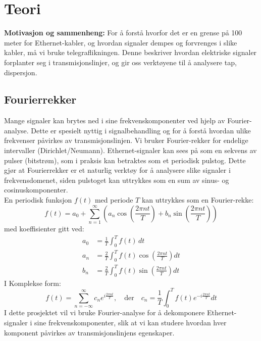 
\section{Teori}

    \textbf{Motivasjon og sammenheng:} For å forstå hvorfor det er en grense på 100 meter for Ethernet-kabler, og hvordan signaler dempes og forvrenges i slike kabler, må vi bruke telegraflikningen. Denne beskriver hvordan elektriske signaler forplanter seg i transmisjonslinjer, og gir oss verktøyene til å analysere tap, dispersjon.

\subsection{Fourierrekker}

Mange signaler kan brytes ned i sine frekvenskomponenter ved hjelp av Fourier-analyse. Dette er spesielt nyttig i signalbehandling og for å forstå hvordan ulike frekvenser påvirkes av transmisjonslinjen. Vi bruker Fourier-rekker for endelige intervaller (Dirichlet/Neumann). Ethernet-signaler kan sees på som en sekvens av pulser (bitstrøm), som i praksis kan betraktes som et periodisk pulstog. Dette gjør at Fourierrekker er et naturlig verktøy for å analysere slike signaler i frekvensdomenet, siden pulstoget kan uttrykkes som en sum av sinus- og cosinuskomponenter.\\[1em]
En periodisk funksjon $f(t)$ med periode $T$ kan uttrykkes som en Fourier-rekke:
\begin{equation}
f(t) = a_0 + \sum_{n=1}^{\infty} \left( a_n \cos\left(\frac{2\pi n t}{T}\right) + b_n \sin\left(\frac{2\pi n t}{T}\right) \right)
\end{equation}
med koeffisienter gitt ved:
\begin{align*}
a_0 &= \frac{1}{T} \int_{0}^{T} f(t) \, dt \\
a_n &= \frac{2}{T} \int_{0}^{T} f(t) \cos\left(\frac{2\pi n t}{T}\right) dt \\
b_n &= \frac{2}{T} \int_{0}^{T} f(t) \sin\left(\frac{2\pi n t}{T}\right) dt
\end{align*}
I Komplekse form:
\begin{equation}
f(t) = \sum_{n=-\infty}^{\infty} c_n e^{i \frac{2\pi n t}{T}}, \quad \text{der} \quad c_n = \frac{1}{T} \int_{0}^{T} f(t) e^{-i \frac{2\pi n t}{T}} dt
\end{equation}
I dette prosjektet vil vi bruke Fourier-analyse for å dekomponere Ethernet-signaler i sine frekvenskomponenter, slik at vi kan studere hvordan hver komponent påvirkes av transmisjonslinjens egenskaper.
